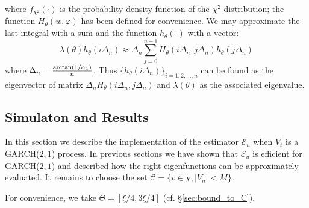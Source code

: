 where $f_{\chi^2}(\cdot)$ is the probability density function of the
$\chi^2$ distribution; the function $H_\theta(w, \varphi)$ has been defined
for convenience.
We may approximate the last integral with a sum and the function
$h_\theta(\cdot)$ with a vector:
\[
\lambda(\theta) h_\theta(i \Delta_n)
\approx
\Delta_n \sum_{j=0}^{n-1} H_\theta(i \Delta_n, j \Delta_n) h_\theta(j \Delta_n)
\]
where $\Delta_n = {\arctan(1/\alpha_1) \over n}$.
Thus $\{h_\theta(i \Delta_n)\}_ {i=1,2,\dots, n}$ can be found as the eigenvector of
matrix $\Delta_n H_\theta(i \Delta_n, j \Delta_n)$ and
$\lambda(\theta)$ as the associated eigenvalue.

\subsection{Simulaton and Results}
In this section we describe the implementation of the estimator
$\mathcal E_u$ when $V_t$ is a GARCH($2, 1$) process. In previous
sections we have shown that $\mathcal E_u$ is efficient for
GARCH($2, 1$) and described how the right eigenfunctions can be
approximately evaluated. It remains to choose the set
$\mathcal C = \{v \in \chi, |V_n| < M\}$.

For convenience, we take $\Theta = [\xi/4, 3\xi/4]$
(cf. \S\ref{sec:bound_to_C}).



  

